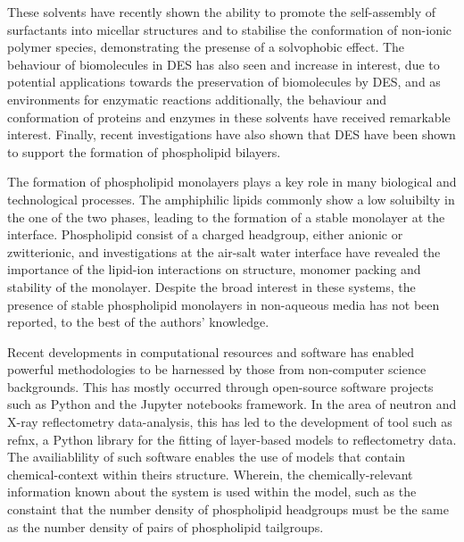 \documentclass[twoside,twocolumn,9pt]{article}
\begin{document}
These solvents have recently shown the ability to promote the self-assembly of surfactants into micellar structures\cite{Sanchez-Fernandez2016,Arnold2015} and to stabilise the conformation of non-ionic polymer species,\cite{Sapir2016} demonstrating the presense of a solvophobic effect. The behaviour of biomolecules in DES has also seen and increase in interest, due to potential applications towards the preservation of biomolecules by DES, and as environments for enzymatic reactions\cite{Merza2018} additionally, the behaviour and conformation of proteins and enzymes in these solvents have received remarkable interest.\cite{Esquembre2013,Gorke2010,Gorke2008,Monhami2014,Wu2014,Harifi-Mood2017,Milano2017,Sanchez-Fernandez2017} Finally, recent investigations have also shown that DES have been shown to support the formation of phospholipid bilayers.\cite{Bryant2017,Bryant2016,Gutierrez2009} 

The formation of phospholipid monolayers plays a key role in many biological and technological processes. The amphiphilic lipids commonly show a low soluibilty in the one of the two phases, leading to the formation of a stable monolayer at the interface.\cite{Mohwald1990} Phospholipid consist of a charged headgroup, either anionic or zwitterionic, and investigations at the air-salt water interface have revealed the importance of the lipid-ion interactions on structure, monomer packing and stability of the monolayer.\cite{Mohwald1990,Kewalramani2010} Despite the broad interest in these systems, the presence of stable phospholipid monolayers in non-aqueous media has not been reported, to the best of the authors' knowledge. 

Recent developments in computational resources and software has enabled powerful methodologies to be harnessed by those from non-computer science backgrounds. This has mostly occurred through open-source software projects such as Python and the Jupyter notebooks framework.\cite{vanRossum1995,Kluyver2016} In the area of neutron and X-ray reflectometry data-analysis, this has led to the development of tool such as refnx,\cite{Nelson2018} a Python library for the fitting of layer-based models to reflectometry data. The availiablility of such software enables the use of models that contain chemical-context within theirs structure. Wherein, the chemically-relevant information known about the system is used within the model, such as the constaint that the number density of phospholipid headgroups must be the same as the number density of pairs of phospholipid tailgroups. 
\end{document}

